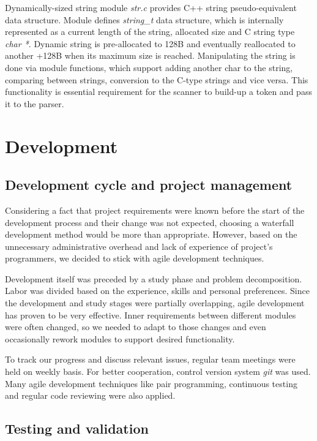 \documentclass[a4paper, 11pt]{article}
\begin{document}
Dynamically-sized string module \emph{str.c} provides C++ string pseudo-equivalent data structure. Module defines  \emph{string\_t} data structure, which is internally represented as a current length of the string, allocated size and C string type \emph{char *}. Dynamic string is pre-allocated to 128B and eventually reallocated to another +128B when its maximum size is reached. Manipulating the string is done via module functions, which support adding another char to the string, comparing between strings, conversion to the C-type strings and vice versa. This functionality is essential requirement for the scanner to build-up a token and pass it to the parser.

\section{Development}

\subsection{Development cycle and project management}

Considering a fact that project requirements were known before the start of the development process and their change was not expected, choosing a waterfall development method would be more than appropriate. However, based on the unnecessary administrative overhead and lack of experience of project's programmers, we decided to stick with agile development techniques.

Development itself was preceded by a study phase and problem decomposition. Labor was divided based on the experience, skills and personal preferences. Since the development and study stages were partially overlapping, agile development has proven to be very effective. Inner requirements between different modules were often changed, so we needed to adapt to those changes and even occasionally rework modules to support desired functionality. 

To track our progress and discuss relevant issues, regular team meetings were held on weekly basis. For better cooperation, control version system \emph{git} was used. Many agile development techniques like pair programming, continuous testing and regular code reviewing were also applied.

\subsection{Testing and validation}
\end{document}
